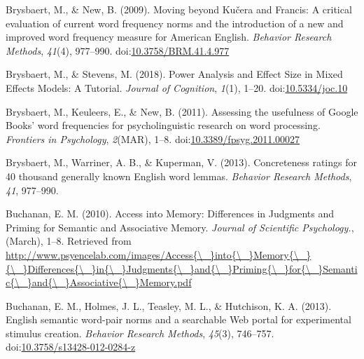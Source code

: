 \documentclass[english,man]{apa6}
\theoremstyle{definition}
\theoremstyle{definition}
\theoremstyle{definition}
\theoremstyle{remark}
\begin{document}
\hypertarget{ref-Brysbaert2009}{}
Brysbaert, M., \& New, B. (2009). Moving beyond Kučera and Francis: A
critical evaluation of current word frequency norms and the introduction
of a new and improved word frequency measure for American English.
\emph{Behavior Research Methods}, \emph{41}(4), 977--990.
doi:\href{https://doi.org/10.3758/BRM.41.4.977}{10.3758/BRM.41.4.977}

\hypertarget{ref-Brysbaert2018}{}
Brysbaert, M., \& Stevens, M. (2018). Power Analysis and Effect Size in
Mixed Effects Models: A Tutorial. \emph{Journal of Cognition},
\emph{1}(1), 1--20.
doi:\href{https://doi.org/10.5334/joc.10}{10.5334/joc.10}

\hypertarget{ref-Brysbaert2011}{}
Brysbaert, M., Keuleers, E., \& New, B. (2011). Assessing the usefulness
of Google Books' word frequencies for psycholinguistic research on word
processing. \emph{Frontiers in Psychology}, \emph{2}(MAR), 1--8.
doi:\href{https://doi.org/10.3389/fpsyg.2011.00027}{10.3389/fpsyg.2011.00027}

\hypertarget{ref-Brysbaert2013}{}
Brysbaert, M., Warriner, A. B., \& Kuperman, V. (2013). Concreteness
ratings for 40 thousand generally known English word lemmas.
\emph{Behavior Research Methods}, \emph{41}, 977--990.

\hypertarget{ref-Buchanan2010}{}
Buchanan, E. M. (2010). Access into Memory: Differences in Judgments and
Priming for Semantic and Associative Memory. \emph{Journal of Scientific
Psychology.}, (March), 1--8. Retrieved from
\href{http://www.psyencelab.com/images/Access\%7B/_\%7Dinto\%7B/_\%7DMemory\%7B/_\%7D\%7B/_\%7DDifferences\%7B/_\%7Din\%7B/_\%7DJudgments\%7B/_\%7Dand\%7B/_\%7DPriming\%7B/_\%7Dfor\%7B/_\%7DSemantic\%7B/_\%7Dand\%7B/_\%7DAssociative\%7B/_\%7DMemory.pdf}{http://www.psyencelab.com/images/Access\{\textbackslash{}\_\}into\{\textbackslash{}\_\}Memory\{\textbackslash{}\_\}\{\textbackslash{}\_\}Differences\{\textbackslash{}\_\}in\{\textbackslash{}\_\}Judgments\{\textbackslash{}\_\}and\{\textbackslash{}\_\}Priming\{\textbackslash{}\_\}for\{\textbackslash{}\_\}Semantic\{\textbackslash{}\_\}and\{\textbackslash{}\_\}Associative\{\textbackslash{}\_\}Memory.pdf}

\hypertarget{ref-Buchanan2013}{}
Buchanan, E. M., Holmes, J. L., Teasley, M. L., \& Hutchison, K. A.
(2013). English semantic word-pair norms and a searchable Web portal for
experimental stimulus creation. \emph{Behavior Research Methods},
\emph{45}(3), 746--757.
doi:\href{https://doi.org/10.3758/s13428-012-0284-z}{10.3758/s13428-012-0284-z}
\end{document}
